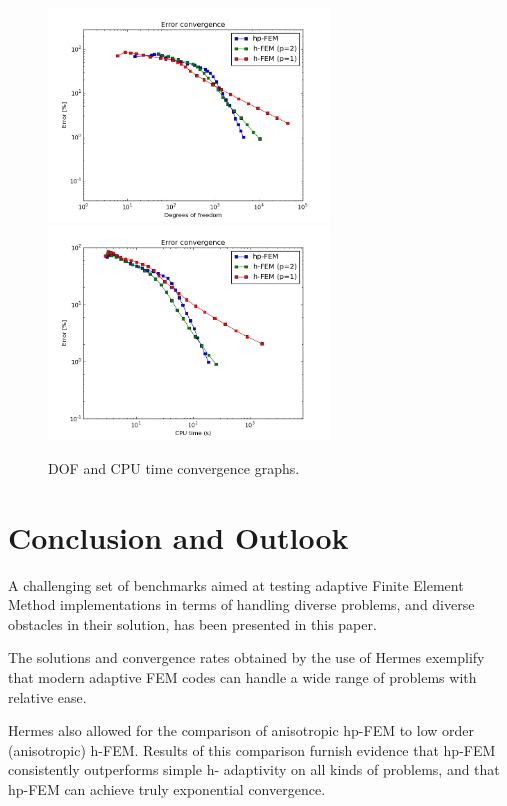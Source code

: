 \documentclass[12pt]{elsarticle}
\begin{document}
\begin{figure}[H]
\centering
\hspace{-50mm}
\includegraphics[width=7.5cm]{nist/nist-12/conv_dof_aniso.png}\ \
\hspace{-10mm}
\includegraphics[width=7.5cm]{nist/nist-12/conv_cpu_aniso.png}
\hspace{-50mm}
\caption{DOF and CPU time convergence graphs.}
\label{fig:nist-12-conv}
\end{figure}


\section{Conclusion and Outlook}
\label{sec:conclusion}

A challenging set of benchmarks aimed at testing adaptive Finite Element Method implementations in terms of handling diverse problems, and diverse obstacles in their solution, has been presented in this paper.

The solutions and convergence rates obtained by the use of Hermes exemplify that modern adaptive FEM codes can handle a wide range of problems with relative ease.

Hermes also allowed for the comparison of anisotropic hp-FEM to low order (anisotropic) h-FEM. Results of this comparison furnish evidence that hp-FEM consistently outperforms simple h- adaptivity on all kinds of problems, and that hp-FEM can achieve truly exponential convergence.
\end{document}
